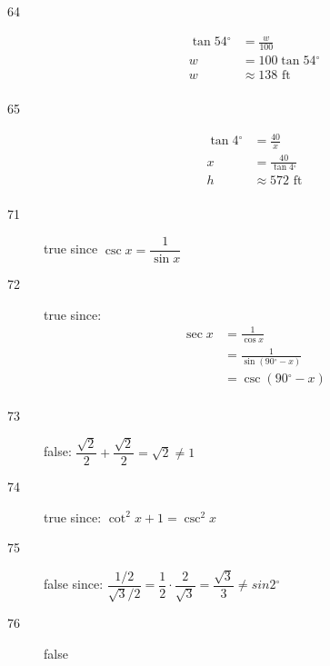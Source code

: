 \documentclass[fleqn,addpoints]{exam}
\newcommand{\degree}{\ensuremath{^\circ}}
\begin{document}
\begin{description}
\item[64]
\begin{align*}
  \tan 54 \degree &= \frac{w}{100} \\
  w &= 100 \tan 54 \degree \\
  w &\approx 138 \text{ ft} \\
\end{align*}

\item[65]
\begin{align*}
  \tan 4 \degree &= \frac{40}{x} \\
  x &= \frac{40}{\tan 4 \degree} \\
  h &\approx 572 \text{ ft} \\
\end{align*}

\item[71]
true since $\csc x = \dfrac{1}{\sin x}$

\item[72]
true since:
\begin{align*}
  \sec x &= \frac{1}{\cos x} \\
  &= \frac{1}{\sin (90 \degree - x)} \\
  &= \csc(90 \degree - x) \\
\end{align*}

\item[73]
false: $\dfrac{\sqrt{2}}{2} + \dfrac{\sqrt{2}}{2} = \sqrt{2} \neq 1$

\item[74]
true since: $\cot^2 x + 1 = \csc^2 x$

\item[75]
false since: $\dfrac{1/2}{\sqrt{3}/2} = \dfrac{1}{2} \cdot \dfrac{2}{\sqrt{3}} = \dfrac{\sqrt{3}}{3} \neq sin 2 \degree$

\item[76]
false

\end{description}
\end{document}
